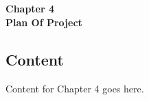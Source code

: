 
\titleformat{\chapter}[block]{\normalfont}{}{0pt}{}
\titlespacing{\chapter}{0pt}{-2em}{0pt}
\chapter[Plan Of Project]{}
\vspace*{\fill}
\begin{center}
\textbf{\Huge{Chapter 4}}\\
\vspace{5mm}
\textbf{\Huge{Plan Of Project}}
\end{center}
\vspace*{\fill}
\newpage

\titleformat{\chapter}[display]{\vspace{1cm}\normalfont\Large\bfseries\centering}{\chaptertitlename\ \thechapter}{20pt}{\vspace{0pt}}
\titlespacing*{\chapter}{0pt}{-50pt}{20pt}

\section{Content}
\justify

Content for Chapter 4 goes here.

